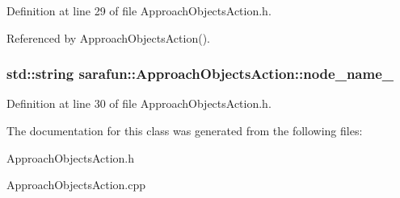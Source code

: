 Definition at line 29 of file Approach\-Objects\-Action.\-h.



Referenced by Approach\-Objects\-Action().

\hypertarget{classsarafun_1_1ApproachObjectsAction_aab08df28b99e94d240a1d3d0056af886_aab08df28b99e94d240a1d3d0056af886}{
\subsubsection[{node\-\_\-name\-\_\-}]{\setlength{\rightskip}{0pt plus 5cm}std\-::string sarafun\-::\-Approach\-Objects\-Action\-::node\-\_\-name\-\_\-\hspace{0.3cm}{\ttfamily [private]}}}\label{classsarafun_1_1ApproachObjectsAction_aab08df28b99e94d240a1d3d0056af886_aab08df28b99e94d240a1d3d0056af886}


Definition at line 30 of file Approach\-Objects\-Action.\-h.



The documentation for this class was generated from the following files\-:\begin{DoxyCompactItemize}
\item 
Approach\-Objects\-Action.\-h\item 
Approach\-Objects\-Action.\-cpp\end{DoxyCompactItemize}
